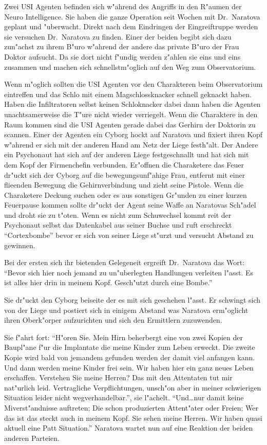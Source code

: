 Zwei USI Agenten befinden sich w"ahrend des Angriffs in den R"aumen der Neuro Intelligence. Sie haben die ganze Operation seit Wochen mit Dr.~Naratova geplant und "uberwacht. Direkt nach dem Eindringen der Eingreiftruppe werden sie versuchen Dr.~Naratova zu finden. Einer der beiden begibt sich dazu zun"achst zu ihrem B"uro w"ahrend der andere das private B"uro der Frau Doktor aufsucht. Da sie dort nicht f"undig werden z"ahlen sie eins und eins zusammen und machen  sich schnellstm"oglich auf den Weg zum Observatorium.

Wenn m"oglich sollten die USI Agenten vor den Charakteren beim Observatorium eintreffen und das Schlo\3 mit einem Magschlossknacker schnell geknackt haben. Haben die Infiltratoren selbst keinen Schlo\3knacker dabei dann haben die Agenten unachtsamerweise die T"ure nicht wieder verriegelt. Wenn die Charaktere in den Raum kommen sind die USI Agenten gerade dabei das Gerhirn der Doktorin zu scannen. Einer der Agenten ein Cyborg hockt auf Naratova und fixiert ihren Kopf w"ahrend er sich mit der anderen Hand am Netz der Liege festh"alt. Der Andere ein Psychonaut hat sich auf der anderen Liege festgeschnallt und hat sich mit dem Kopf der Firmenchefin verbunden. Er"offnen die Charaketere das Feuer dr"uckt sich der Cyborg auf die bewegungsunf"ahige Frau, entfernt mit einer flie\3enden Bewegung die Gehirnverbindung und zieht seine Pistole. Wenn die Charaketere Deckung suchen oder es aus sonstigen Gr"unden zu einer kurzen Feuerpause kommen sollte dr"uckt der Agent seine Waffe an Naratovas Sch"adel und droht sie zu t"oten. Wenn es nicht zum Schu\3wechsel kommt rei\3t der Psychonaut selbst das Datenkabel aus seiner Buchse und ruft erschreckt ``Cortexbombe'' bevor er sich von seiner Liege st"urzt und versucht Abstand zu gewinnen.

Bei der ersten sich ihr bietenden Gelegeneit ergreift Dr.~Naratova das Wort: ``Bevor sich hier noch jemand zu un"uberlegten Handlungen verleiten l"asst. Es ist alles hier drin in meinem Kopf. Gesch"utzt durch eine Bombe.''

Sie dr"uckt den Cyborg beiseite der es mit sich geschehen l"asst. Er schwingt sich von der Liege und postiert sich in einigem Abstand was Naratova erm"oglicht ihren Oberk"orper aufzurichten und sich den Ermittlern zuzuwenden.

Sie f"ahrt fort: ``H"oren Sie. Mein Hirn beherbergt eine von zwei Kopien der Baupl"ane f"ur die Implantate die meine Kinder zum Leben erweckt. Die zweite Kopie wird bald von jemandem gefunden werden der damit viel anfangen kann. Und dann werden meine Kinder frei sein. Wir haben hier ein ganz neues Leben erschaffen. Verstehen Sie meine Herren? Das mit den Attentaten tut mir nat"urlich leid. Vertragliche Verpflichtungen, unsch"on aber in meiner schwierigen Situation leider nicht wegverhandelbar.'', sie l"achelt. ``Und\dots{}nur damit keine Mi\3verst"andnisse auftreten; Die schon produzierten Attent"ater oder Freien; Wer das ist das steckt auch in meinem Kopf. Sie sehen meine Herren. Wir haben quasi aktuell eine Patt Situation.'' Naratova wartet nun auf eine Reaktion der beiden anderen Parteien.


